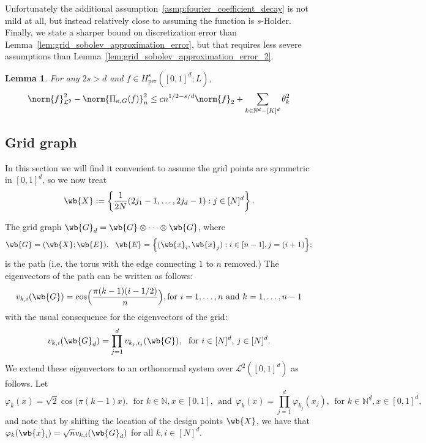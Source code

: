 \documentclass{article}
\newcommand{\set}[1]{\left\{#1\right\}}
\newcommand{\1}{\mathbf{1}}
\newcommand{\Nbb}{\mathbb{N}}
\newcommand{\Leb}{\mathcal{L}}
\theoremstyle{alden}
\theoremstyle{aldenthm}
\newtheorem{lemma}{Lemma}
\theoremstyle{definition}
\theoremstyle{remark}
\begin{document}
Unfortunately the additional assumption~\eqref{asmp:fourier_coefficient_decay} is not mild at all, but instead relatively close to assuming the function is $s$-Holder.
Finally, we state a sharper bound on discretization error than Lemma~\ref{lem:grid_sobolev_approximation_error}, but that requires less severe assumptions than Lemma~\ref{lem:grid_sobolev_approximation_error_2}.
\begin{lemma}
	\label{lem:grid_sobolev_approximation_error_3}
	For any $2s > d$ and $f \in H_{\textrm{per}}^s([0,1]^d;L)$, 
	\begin{equation*}
	\norm{f}_{\Leb^2}^2 - \norm{\Pi_{\kappa,G}(f)}_{n}^2 \leq c n^{1/2 - s/d} \norm{f}_2 + \sum_{k \in \mathbb{N}^d - [K]^d} \theta_k^2
	\end{equation*}
\end{lemma}

\subsection{Grid graph}
In this section we will find it convenient to assume the grid points are symmetric in $[0,1]^d$, so we now treat
\begin{equation*}
\wb{X} := \set{\frac{1}{2N}(2j_1 - 1,\ldots,2j_d - 1): j \in [N]^d}.
\end{equation*}

The grid graph $\wb{G}_d = \wb{G} \otimes \cdots \otimes \wb{G}$, where
\begin{equation*}
\wb{G} = (\wb{X}; \wb{E}),~~ \wb{E} = \Bigl\{(\wb{x}_i,\wb{x}_j): i \in [n - 1], j = (i + 1)\Bigr\}; 
\end{equation*}
is the path (i.e. the torus with the edge connecting $1$ to $n$ removed.) The eigenvectors of the path can be written as follows:
\begin{equation*}
v_{k,i}(\wb{G}) = \cos\Bigl(\frac{\pi (k - 1) (i - 1/2)}{n}\Bigr), \textrm{for $i = 1,\ldots,n$ and $k = 1,\ldots,n - 1$}
\end{equation*}
with the usual consequence for the eigenvectors of the grid:
\begin{equation*}
v_{k,i}(\wb{G}_d) = \prod_{j = 1}^d v_{k_j,i_j}(\wb{G}),~~ \textrm{for $i \in [N]^d$, $j \in [N]^d$.}
\end{equation*}
We extend these eigenvectors to an orthonormal system over $\Leb^2([0,1]^d)$ as follows. Let
\begin{equation*}
\varphi_k(x) = \sqrt{2}\cos\biggl(\pi (k - 1) x\biggr),~~\textrm{for $k \in \Nbb, x \in [0,1]$},~~\textrm{and}~~ \varphi_k(x) = \prod_{j = 1}^{d} \varphi_{k_j}(x_j),~~\textrm{for $k \in \Nbb^d, x \in [0,1]^d$},
\end{equation*}
and note that by shifting the location of the design points $\wb{X}$, we have that $\varphi_k(\wb{x}_i) = \sqrt{n} v_{k,i}(\wb{G}_d)$ for all $k,i \in [N]^d$.
\end{document}
